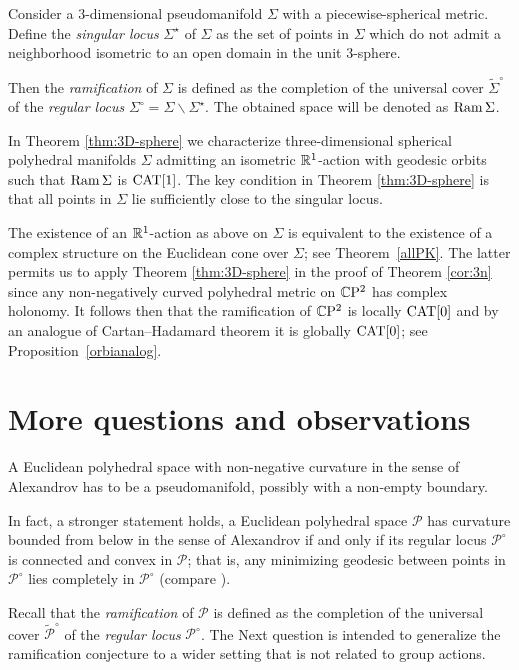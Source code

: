 \documentclass[oneside,a4paper]{article}
\begin{document}
Consider a $3$-dimensional pseudomanifold $\Sigma$ with a piecewise-spherical metric.
Define the \emph{singular locus} $\Sigma^{{\star}}$ of $\Sigma$
as the set of points in $\Sigma$ which do not admit a neighborhood isometric to an open domain in
the unit $3$-sphere.

Then the {\it ramification} of $\Sigma$
is defined as the  completion of the universal cover $\tilde {\Sigma}^\circ$ of the \emph{regular locus} $\Sigma^\circ=\Sigma\backslash\Sigma^{{\star}}$.
The obtained space will be denoted as $\mathop{\rm Ram}\nolimits\Sigma$.

In Theorem \ref{thm:3D-sphere} we  characterize three-dimensional spherical polyhedral manifolds $\Sigma$
admitting an isometric $\mathbb{R}^1$-action with geodesic orbits such that $\mathop{\rm Ram}\nolimits\Sigma$ is $\mathrm{CAT}[1]$.
The key condition in Theorem \ref{thm:3D-sphere} is that all points in $\Sigma$  lie sufficiently close to the singular locus.

The existence of an $\mathbb{R}^1$-action as above on $\Sigma$ is equivalent to the existence of
a complex structure on the Euclidean cone over $\Sigma$;
see Theorem~\ref{allPK}. 
The latter permits us to apply Theorem \ref{thm:3D-sphere} in the proof of Theorem \ref{cor:3n}
since any non-negatively curved polyhedral metric on $\mathbb{C}\mathrm{P}^2$ has complex holonomy.
It follows then that the ramification of $\mathbb{C}\mathrm{P}^2$ is locally $\mathrm{CAT}[0]$ and by an analogue of Cartan--Hadamard theorem it is globally $\mathrm{CAT}[0]$;
see Proposition~\ref{orbianalog}.





\section{More questions and observations}\label{sec:questions}

A Euclidean polyhedral space with
non-negative curvature in the sense of Alexandrov has to be a pseudomanifold, possibly with a non-empty boundary.

In fact, a stronger statement holds,
a Euclidean polyhedral space $\mathcal{P}$
has curvature bounded from below in the sense of Alexandrov
if and only if
its regular locus $\mathcal{P}^\circ$
is connected and convex in $\mathcal{P}$;
that is, any minimizing geodesic between points in $\mathcal{P}^\circ$ lies completely in $\mathcal{P}^\circ$ (compare \cite[Theorem 5]{milka}).

Recall that the {\it ramification} of $\mathcal{P}$
is defined as the  completion of the universal cover $\tilde {\mathcal{P}}^\circ$ of the \emph{regular locus} $\mathcal{P}^\circ$.
The Next question is intended to generalize the ramification conjecture 
to a wider setting that is not related to group actions.
\end{document}
